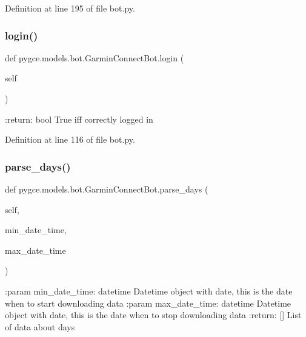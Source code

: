 Definition at line 195 of file bot.\+py.

\mbox{\label{classpygce_1_1models_1_1bot_1_1_garmin_connect_bot_a31c8153cff1e4c2ce2a66d3b3aada3f1}} 
\subsubsection{\texorpdfstring{login()}{login()}}
{\footnotesize\ttfamily def pygce.\+models.\+bot.\+Garmin\+Connect\+Bot.\+login (\begin{DoxyParamCaption}\item[{}]{self }\end{DoxyParamCaption})}

\begin{DoxyVerb}:return: bool
    True iff correctly logged in
\end{DoxyVerb}
 

Definition at line 116 of file bot.\+py.

\mbox{\label{classpygce_1_1models_1_1bot_1_1_garmin_connect_bot_a17c3b23e3a712395581e88294308b822}} 
\subsubsection{\texorpdfstring{parse\+\_\+days()}{parse\_days()}}
{\footnotesize\ttfamily def pygce.\+models.\+bot.\+Garmin\+Connect\+Bot.\+parse\+\_\+days (\begin{DoxyParamCaption}\item[{}]{self,  }\item[{}]{min\+\_\+date\+\_\+time,  }\item[{}]{max\+\_\+date\+\_\+time }\end{DoxyParamCaption})}

\begin{DoxyVerb}:param min_date_time: datetime
    Datetime object with date, this is the date when to start downloading data
:param max_date_time: datetime
    Datetime object with date, this is the date when to stop downloading data
:return: []
    List of data about days
\end{DoxyVerb}
 

